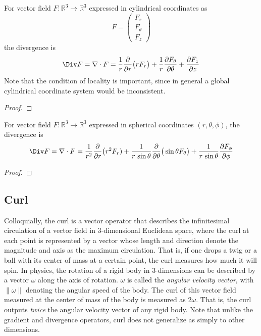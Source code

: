   \begin{lemma}
		For vector field $F: \mathbb{R}^3 \longrightarrow \mathbb{R}^3$ expressed in cylindrical coordinates as 
		\begin{equation}
			F = \begin{pmatrix} F_r \\ F_\theta \\ F_z \end{pmatrix}
		\end{equation}
		the divergence is
		\begin{equation}
			\Div F = \nabla \cdot F = \frac{1}{r} \frac{\partial}{\partial r} \big(r F_r \big) + \frac{1}{r} \frac{\partial F_\theta}{\partial \theta} + \frac{\partial F_z}{\partial z}
		\end{equation}
		Note that the condition of locality is important, since in general a global cylindrical coordinate system would be inconsistent. 
  \end{lemma}
	\begin{proof}
	  
	\end{proof}

  \begin{lemma}
		For vector field $F: \mathbb{R}^3 \longrightarrow \mathbb{R}^3$ expressed in spherical coordinates $(r, \theta, \phi)$, the divergence is 
		\begin{equation}
			\Div F = \nabla \cdot F = \frac{1}{r^2} \frac{\partial}{\partial r} \big( r^2 F_r) + \frac{1}{r \, \sin{\theta}} \frac{\partial}{\partial \theta} \big( \sin{\theta} F_\theta\big) + \frac{1}{r\, \sin{\theta}} \frac{\partial F_\phi}{\partial \phi}
		\end{equation}
  \end{lemma}
	\begin{proof}
	  
	\end{proof}

\subsection{Curl}

  Colloquially, the curl is a vector operator that describes the infinitesimal circulation of a vector field in $3$-dimensional Euclidean space, where the curl at each point is represented by a vector whose length and direction denote the magnitude and axis as the maximum circulation. That is, if one drops a twig or a ball with its center of mass at a certain point, the curl measures how much it will spin. In physics, the rotation of a rigid body in 3-dimensions can be described by a vector $\omega$ along the axis of rotation. $\omega$ is called the \textit{angular velocity vector}, with $\|\omega\|$ denoting the angular speed of the body. The curl of this vector field measured at the center of mass of the body is measured as $2 \omega$. That is, the curl outputs \textit{twice} the angular velocity vector of any rigid body. Note that unlike the gradient and divergence operators, curl does not generalize as simply to other dimensions. 

